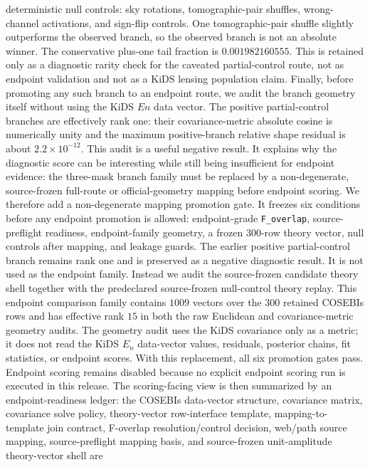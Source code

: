 \documentclass[11pt]{article}
\begin{document}
deterministic null controls: sky rotations, tomographic-pair shuffles,
wrong-channel activations, and sign-flip controls. One tomographic-pair shuffle
slightly outperforms the observed branch, so the observed branch is not an
absolute winner. The conservative plus-one tail fraction is \(0.001982160555\).
This is retained only as a diagnostic rarity check for the caveated
partial-control route, not as endpoint validation and not as a KiDS lensing
population claim.
Finally, before promoting any such branch to an endpoint route, we audit the
branch geometry itself without using the KiDS \(En\) data vector. The positive
partial-control branches are effectively rank one: their covariance-metric
absolute cosine is numerically unity and the maximum positive-branch relative
shape residual is about \(2.2\times10^{-12}\). This audit is a useful negative
result. It explains why the diagnostic score can be interesting while still
being insufficient for endpoint evidence: the three-mask branch family must be
replaced by a non-degenerate, source-frozen full-route or official-geometry
mapping before endpoint scoring.
We therefore add a non-degenerate mapping promotion gate. It freezes six
conditions before any endpoint promotion is allowed: endpoint-grade
\texttt{F\_\allowbreak{}overlap}, source-preflight readiness, endpoint-family geometry, a
frozen 300-row theory vector, null controls after mapping, and leakage guards.
The earlier positive partial-control branch remains rank one and is preserved
as a negative diagnostic result. It is not used as the endpoint family. Instead
we audit the source-frozen candidate theory shell together with the
predeclared source-frozen null-control theory replay. This endpoint comparison
family contains \(1009\) vectors over the \(300\) retained COSEBIs rows and has
effective rank \(15\) in both the raw Euclidean and covariance-metric geometry
audits. The geometry audit uses the KiDS covariance only as a metric; it does
not read the KiDS \(E_n\) data-vector values, residuals, posterior chains, fit
statistics, or endpoint scores. With this replacement, all six promotion gates
pass. Endpoint scoring remains disabled because no explicit endpoint scoring
run is executed in this release.
The scoring-facing view is then summarized by an endpoint-readiness ledger:
the COSEBIs data-vector structure, covariance matrix, covariance solve policy,
theory-vector row-interface template, mapping-to-template join contract,
F-overlap resolution/control decision, web/path source mapping, source-preflight
mapping basis, and source-frozen unit-amplitude theory-vector shell are
\end{document}
